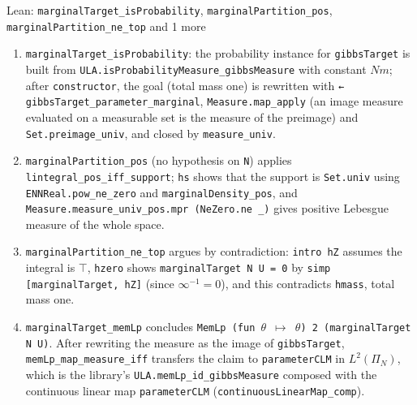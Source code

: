 \documentclass[11pt,a4paper]{article}
\begin{document}
\begin{leanbox}{Lean: \texttt{marginalTarget\_\allowbreak{}isProbability}, \texttt{marginalPartition\_\allowbreak{}pos}, \texttt{marginalPartition\_\allowbreak{}ne\_\allowbreak{}top} and 1 more}
\begin{enumerate}
\item \texttt{marginal\allowbreak{}Target\_\allowbreak{}is\allowbreak{}Probability}: the probability instance for \texttt{gibbs\allowbreak{}Target} is built from \texttt{ULA.\allowbreak{}is\allowbreak{}Probability\allowbreak{}Measure\_\allowbreak{}gibbs\allowbreak{}Measure} with constant \(Nm\); after \texttt{constructor}, the goal (total mass one) is rewritten with \texttt{← gibbs\allowbreak{}Target\_\allowbreak{}parameter\_\allowbreak{}marginal}, \texttt{Measure.\allowbreak{}map\_\allowbreak{}apply} (an image measure evaluated on a measurable set is the measure of the preimage) and \texttt{Set.\allowbreak{}preimage\_\allowbreak{}univ}, and closed by \texttt{measure\_\allowbreak{}univ}.

\item \texttt{marginal\allowbreak{}Partition\_\allowbreak{}pos} (no hypothesis on \texttt{N}) applies \texttt{lintegral\_\allowbreak{}pos\_\allowbreak{}iff\_\allowbreak{}support}; \texttt{hs} shows that the support is \texttt{Set.\allowbreak{}univ} using \texttt{ENNReal.\allowbreak{}pow\_\allowbreak{}ne\_\allowbreak{}zero} and \texttt{marginal\allowbreak{}Density\_\allowbreak{}pos}, and \texttt{Measure.\allowbreak{}measure\_\allowbreak{}univ\_\allowbreak{}pos.\allowbreak{}mpr (Ne\allowbreak{}Zero.\allowbreak{}ne \_\allowbreak{})} gives positive Lebesgue measure of the whole space.

\item \texttt{marginal\allowbreak{}Partition\_\allowbreak{}ne\_\allowbreak{}top} argues by contradiction: \texttt{intro h\allowbreak{}Z} assumes the integral is \texttt{\ensuremath{\top}}, \texttt{hzero} shows \texttt{marginal\allowbreak{}Target N U = 0} by \texttt{simp [marginal\allowbreak{}Target, h\allowbreak{}Z]} (since \(\infty^{-1}=0\)), and this contradicts \texttt{hmass}, total mass one.

\item \texttt{marginal\allowbreak{}Target\_\allowbreak{}mem\allowbreak{}Lp} concludes \texttt{Mem\allowbreak{}Lp (fun \ensuremath{\theta} \ensuremath{\mapsto} \ensuremath{\theta}) 2 (marginal\allowbreak{}Target N U)}. After rewriting the measure as the image of \texttt{gibbs\allowbreak{}Target}, \texttt{mem\allowbreak{}Lp\_\allowbreak{}map\_\allowbreak{}measure\_\allowbreak{}iff} transfers the claim to \texttt{parameter\allowbreak{}CLM} in \(L^2(\Pi_N)\), which is the library's \texttt{ULA.\allowbreak{}mem\allowbreak{}Lp\_\allowbreak{}id\_\allowbreak{}gibbs\allowbreak{}Measure} composed with the continuous linear map \texttt{parameter\allowbreak{}CLM} (\texttt{continuous\allowbreak{}Linear\allowbreak{}Map\_\allowbreak{}comp}).

\end{enumerate}
\end{leanbox}
\end{document}
